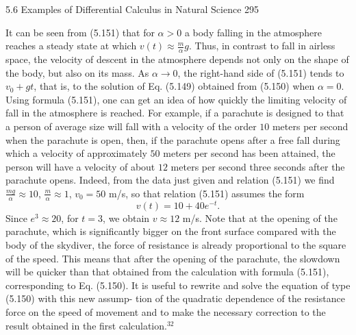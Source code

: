 5.6 Examples of Differential Calculus in Natural Science 295

It can be seen from (5.151) that for $\alpha > 0$ a body falling in the atmosphere reaches
a steady state at which $v(t) \approx \frac{m}{\alpha}g$. Thus, in contrast to fall in airless space, the
velocity of descent in the atmosphere depends not only on the shape of the body, but
also on its mass. As $\alpha \to 0$, the right-hand side of (5.151) tends to $v_0 + gt$, that is,
to the solution of Eq. (5.149) obtained from (5.150) when $\alpha = 0$.
Using formula (5.151), one can get an idea of how quickly the limiting velocity
of fall in the atmosphere is reached.
For example, if a parachute is designed to that a person of average size will fall
with a velocity of the order $10$ meters per second when the parachute is open, then,
if the parachute opens after a free fall during which a velocity of approximately
$50$ meters per second has been attained, the person will have a velocity of about
$12$ meters per second three seconds after the parachute opens.
Indeed, from the data just given and relation (5.151) we find $\frac{mg}{\alpha} \approx 10$, $\frac{m}{\alpha} \approx 1$,
$v_0 = 50$ m/s, so that relation (5.151) assumes the form
$$v(t) = 10 + 40e^{-t}.$$
Since $e^3 \approx 20$, for $t=3$, we obtain $v \approx 12$ m/s.
Note that at the opening of the parachute, which is significantly bigger on the
front surface compared with the body of the skydiver, the force of resistance is
already proportional to the square of the speed. This means that after the opening of
the parachute, the slowdown will be quicker than that obtained from the calculation
with formula (5.151), corresponding to Eq. (5.150).
It is useful to rewrite and solve the equation of type (5.150) with this new assump-
tion of the quadratic dependence of the resistance force on the speed of movement
and to make the necessary correction to the result obtained in the first calculation.$^{32}$

